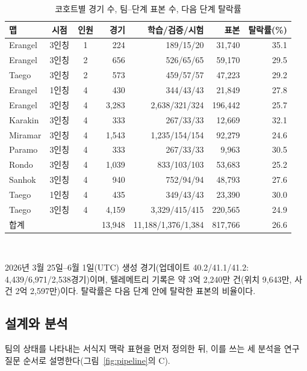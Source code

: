 \begin{table}[t]
\centering
\caption{코호트별 경기 수, 팀--단계 표본 수, 다음 단계 탈락률}
\label{tab:cohorts}
\footnotesize
\setlength{\tabcolsep}{2.7pt}
\begin{tabular}{lccrrrr}
\hline
맵 & 시점 & 인원 & 경기 & 학습/검증/시험 & 표본 & 탈락률(\%) \\
\hline
Erangel & 3인칭 & 1 & 224 & 189/15/20 & 31,740 & 35.1 \\
Erangel & 3인칭 & 2 & 656 & 526/65/65 & 59,170 & 29.5 \\
Taego & 3인칭 & 2 & 573 & 459/57/57 & 47,223 & 29.2 \\
Erangel & 1인칭 & 4 & 430 & 344/43/43 & 21,849 & 27.8 \\
Erangel & 3인칭 & 4 & 3,283 & 2,638/321/324 & 196,442 & 25.7 \\
Karakin & 3인칭 & 4 & 333 & 267/33/33 & 12,669 & 32.1 \\
Miramar & 3인칭 & 4 & 1,543 & 1,235/154/154 & 92,279 & 24.6 \\
Paramo & 3인칭 & 4 & 333 & 267/33/33 & 9,963 & 30.5 \\
Rondo & 3인칭 & 4 & 1,039 & 833/103/103 & 53,683 & 25.2 \\
Sanhok & 3인칭 & 4 & 940 & 752/94/94 & 48,793 & 27.6 \\
Taego & 1인칭 & 4 & 435 & 349/43/43 & 23,390 & 30.0 \\
Taego & 3인칭 & 4 & 4,159 & 3,329/415/415 & 220,565 & 24.9 \\
\hline
합계 & & & 13,948 & 11,188/1,376/1,384 & 817,766 & 26.6 \\
\hline
\end{tabular}
\\[2pt]
\parbox{\columnwidth}{\scriptsize 2026년 3월 25일--6월 1일(UTC) 생성 경기(업데이트 40.2/41.1/41.2: 4,439/6,971/2,538경기)이며, 텔레메트리 기록은 약 3억 2,240만 건(위치 9,643만, 사건 2억 2,597만)이다. 탈락률은 다음 단계 안에 탈락한 표본의 비율이다.}
\end{table}

\subsection{설계와 분석}
\label{sec:method:design}
팀의 상태를 나타내는 서식지 맥락 표현을 먼저 정의한 뒤, 이를 쓰는 세 분석을 연구 질문 순서로 설명한다(그림~\ref{fig:pipeline}의 C).

